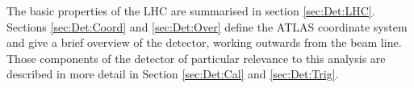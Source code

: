 The basic properties of the LHC are summarised in section \ref{sec:Det:LHC}. 
Sections \ref{sec:Det:Coord} and \ref{sec:Det:Over} define the ATLAS coordinate system and give a brief overview of the detector, working outwards from the beam line.
Those components of the detector of particular relevance to this analysis are described in more detail in Section \ref{sec:Det:Cal} and \ref{sec:Det:Trig}.
